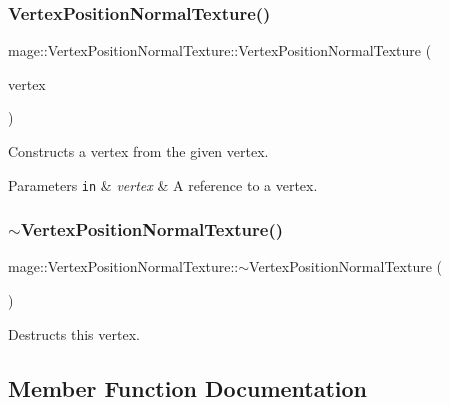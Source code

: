 \subsubsection{\texorpdfstring{Vertex\+Position\+Normal\+Texture()}{VertexPositionNormalTexture()}\hspace{0.1cm}{\footnotesize\ttfamily [3/3]}}
{\footnotesize\ttfamily mage\+::\+Vertex\+Position\+Normal\+Texture\+::\+Vertex\+Position\+Normal\+Texture (\begin{DoxyParamCaption}\item[{const \hyperlink{structmage_1_1_vertex_position_normal_texture}{Vertex\+Position\+Normal\+Texture} \&}]{vertex }\end{DoxyParamCaption})\hspace{0.3cm}{\ttfamily [default]}}

Constructs a vertex from the given vertex.


\begin{DoxyParams}[1]{Parameters}
\mbox{\tt in}  & {\em vertex} & A reference to a vertex. \\
\hline
\end{DoxyParams}
\hypertarget{structmage_1_1_vertex_position_normal_texture_a1dbfd9a6f88f075b59e56c353986b189}{}\label{structmage_1_1_vertex_position_normal_texture_a1dbfd9a6f88f075b59e56c353986b189} 
\subsubsection{\texorpdfstring{$\sim$\+Vertex\+Position\+Normal\+Texture()}{~VertexPositionNormalTexture()}}
{\footnotesize\ttfamily mage\+::\+Vertex\+Position\+Normal\+Texture\+::$\sim$\+Vertex\+Position\+Normal\+Texture (\begin{DoxyParamCaption}{ }\end{DoxyParamCaption})\hspace{0.3cm}{\ttfamily [default]}}

Destructs this vertex. 

\subsection{Member Function Documentation}
\hypertarget{structmage_1_1_vertex_position_normal_texture_a89b92b0932f3271cb90c3a800e6c60a3}{}\label{structmage_1_1_vertex_position_normal_texture_a89b92b0932f3271cb90c3a800e6c60a3} 
